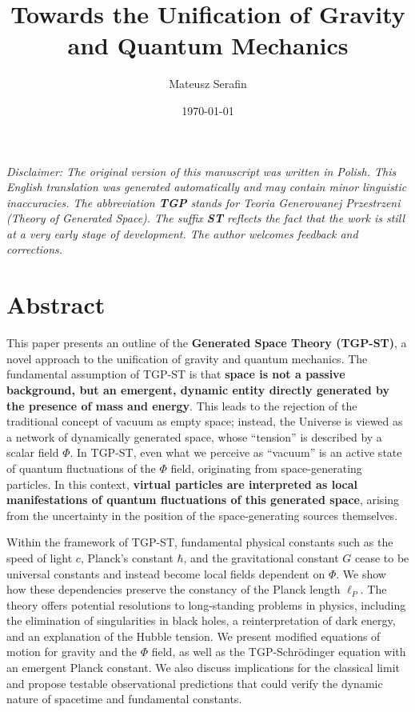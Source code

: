 \documentclass[11pt,a4paper]{article}
\begin{document}
\title{Towards the Unification of Gravity and Quantum Mechanics}
\begin{center}
\textit{Disclaimer: The original version of this manuscript was written in Polish. This English translation was generated automatically and may contain minor linguistic inaccuracies. The abbreviation \textbf{TGP} stands for \textit{Teoria Generowanej Przestrzeni} (Theory of Generated Space). The suffix \textbf{ST} reflects the fact that the work is still at a very early stage of development. The author welcomes feedback and corrections.}
\end{center}

\author{Mateusz Serafin}

\date{\today}

\maketitle 


\section{Abstract}
\label{sec:Abstract}

This paper presents an outline of the \textbf{Generated Space Theory (TGP-ST)}, a novel approach to the unification of gravity and quantum mechanics. The fundamental assumption of TGP-ST is that \textbf{space is not a passive background, but an emergent, dynamic entity directly generated by the presence of mass and energy}. This leads to the rejection of the traditional concept of vacuum as empty space; instead, the Universe is viewed as a network of dynamically generated space, whose “tension” is described by a scalar field $\Phi$. In TGP-ST, even what we perceive as “vacuum” is an active state of quantum fluctuations of the $\Phi$ field, originating from space-generating particles. In this context, \textbf{virtual particles are interpreted as local manifestations of quantum fluctuations of this generated space}, arising from the uncertainty in the position of the space-generating sources themselves.

Within the framework of TGP-ST, fundamental physical constants such as the speed of light $c$, Planck’s constant $\hbar$, and the gravitational constant $G$ cease to be universal constants and instead become local fields dependent on $\Phi$. We show how these dependencies preserve the constancy of the Planck length $\ell_P$. The theory offers potential resolutions to long-standing problems in physics, including the elimination of singularities in black holes, a reinterpretation of dark energy, and an explanation of the Hubble tension. We present modified equations of motion for gravity and the $\Phi$ field, as well as the TGP-Schrödinger equation with an emergent Planck constant. We also discuss implications for the classical limit and propose testable observational predictions that could verify the dynamic nature of spacetime and fundamental constants.
\end{document}

